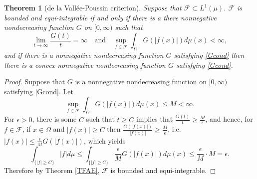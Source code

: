 \documentclass{article}
\newtheorem{theorem}{Theorem}
\theoremstyle{definition}
\begin{document}
\begin{theorem}[de la Vall\'ee-Poussin criterion]
Suppose that $\mathscr{F} \subset L^1(\mu)$. $\mathscr{F}$ is bounded and equi-integrable if and only if  there
is a there nonnegative nondecreasing function $G$ on $[0,\infty)$ such that
\begin{equation}
\lim_{t \to \infty} \frac{G(t)}{t}=\infty \quad \textrm{and}
\quad \sup_{f \in \mathscr{F}} \int_\Omega G(|f(x)|) d\mu(x)<\infty,
\label{Gcond}
\end{equation}
and if there is a nonnegative nondecreasing function $G$ satisfying \eqref{Gcond} then there is a convex
nonnegative nondecreasing function $G$ satisfying \eqref{Gcond}.
\end{theorem}
\begin{proof}
Suppose that $G$ is a nonnegative nondecreasing function on $[0,\infty)$ satisfying \eqref{Gcond}. Let
\[
\sup_{f \in \mathscr{F}} \int_\Omega G(|f(x)|) d\mu(x) \leq M < \infty.
\]
For $\epsilon>0$, there is some $C$ such that $t \geq C$ implies that $\frac{G(t)}{t} \geq \frac{M}{\epsilon}$, and hence, for $f \in \mathscr{F}$,
if $x \in \Omega$ and $|f(x)| \geq C$ then $\frac{G(|f(x)|)}{|f(x)|} \geq \frac{M}{\epsilon}$, i.e.
$|f(x)| \leq \frac{\epsilon}{M} G(|f(x)|)$, which yields
\[
\int_{\{|f| \geq C\}} |f| d\mu \leq \int_{\{|f| \geq C\}} \frac{\epsilon}{M} G(|f(x)|) d\mu(x)
\leq \frac{\epsilon}{M} \cdot M = \epsilon.
\] 
Therefore by Theorem \ref{TFAE}, $\mathscr{F}$ is bounded and equi-integrable. 


\end{proof}
\end{document}
